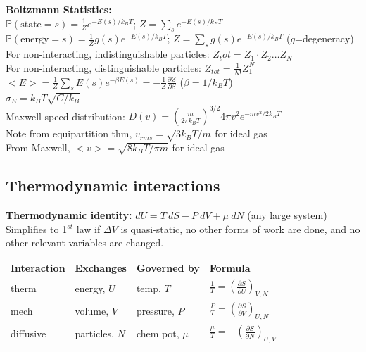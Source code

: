 \documentclass[letterpaper,landscape,10pt]{article}
\begin{document}
{\begin{multicols}{4}
	\textbf{Boltzmann Statistics:} \\
	\hspace{5pt} $\mathbb{P}(\textrm{state}=s) = \frac{1}{Z}e^{-E(s)/k_BT}$; $Z = \sum_s e^{-E(s)/k_BT}$ \\
	\hspace{5pt} $\mathbb{P}(\textrm{energy}=s) = \frac{1}{Z}g(s)e^{-E(s)/k_BT}$; $Z = \sum_s g(s)e^{-E(s)/k_BT}$ ($g$=degeneracy)\\
	\hspace{5pt} For non-interacting, indistinguishable particles: $Z_tot = Z_1 \cdot Z_2 \dots Z_N$ \\
	\hspace{5pt} For non-interacting, distinguishable particles: $Z_{tot} = \frac{1}{N!}Z_1^N$ \\
	\hspace{5pt} $<E> = \frac{1}{Z}\sum_s E(s) e^{-\beta E(s)}=-\frac{1}{Z}\frac{\partial Z}{\partial\beta}$ ($\beta=1/k_BT$) \\
	\hspace{5pt} $\sigma_E = k_BT\sqrt{C/k_B}$ \\
	\hspace{5pt} Maxwell speed distribution: $D(v) = \left( \frac{m}{2\pi k_BT} \right)^{3/2} 4\pi v^2e^{-mv^2/2k_BT}$ \\
	\hspace{5pt} Note from equipartition thm, $v_{rms} = \sqrt{3k_BT/m}$ for ideal gas \\
	\hspace{5pt} From Maxwell, $<v> = \sqrt{8k_BT/\pi m}$ for ideal gas \\

	\subsection*{Thermodynamic interactions}
	\textbf{Thermodynamic identity:} $dU = T \:dS - P \:dV + \mu \: dN$ (any
	  large system) \\
	  Simplifies to 1$^{st}$ law if $\Delta V$ is quasi-static, no other forms
	  of work are done, and no other relevant variables are changed.\\
		\begin{tabular}{l l l l}
		  \textbf{Interaction}& \textbf{Exchanges} & \textbf{Governed by}& \textbf{Formula} \\[1pt]
			therm       & energy, $U$ & temp, $T$           & $\frac{1}{T}=\left( \frac{\partial S}{\partial U} \right)_{V,N}$ \\
			[1pt]
			mech       & volume, $V$ & pressure, $P$       & $\frac{P}{T}=\left( \frac{\partial S}{\partial V} \right)_{U,N}$ \\
			[1pt]
			diffusive       & particles, $N$ & chem pot, $\mu$  & $\frac{\mu}{T}=-\left( \frac{\partial S}{\partial N} \right)_{U,V}$
		\end{tabular}

\end{multicols}}
\end{document}

